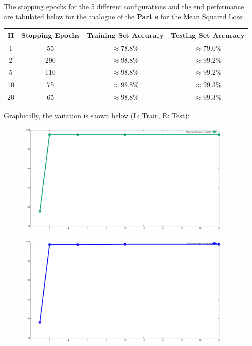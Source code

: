 \documentclass{article}
\begin{document}
\begin{flushleft}
The stopping epochs for the 5 different configurations and the end performance are tabulated below for the analogue of the \textbf{Part e} for the Mean Squared Loss:
\begin{center}
\begin{tabular}{|c|c|c|c|}
\hline
H & Stopping Epochs & Training Set Accuracy & Testing Set Accuracy \\
\hline
1 & 55 & \(\approx 78.8\%\) & \(\approx 79.0\%\)\\
\hline
2 & 290 & \(\approx 98.8\%\)& \(\approx 99.2\%\)\\
\hline
5 & 110 & \(\approx 98.8\%\)& \(\approx 99.2\%\)\\
\hline
10 & 75 & \(\approx 98.8\%\)& \(\approx 99.3\%\)\\
\hline
20 & 65 & \(\approx 98.8\%\)& \(\approx 99.3\%\)\\
\hline
\end{tabular}
\end{center}

Graphically, the variation is shown below (L: Train, R: Test):
\begin{minipage}{0.49\linewidth}
\begin{figure}[H]
\centering
\includegraphics[width=0.95\textwidth]{train_H_MSE.png}
\end{figure}
\end{minipage}
\hfill
\begin{minipage}{0.49\linewidth}
\begin{figure}[H]
\centering
\includegraphics[width=0.95\textwidth]{test_H_MSE.png}
\end{figure}
\end{minipage}
\end{flushleft}
\end{document}
